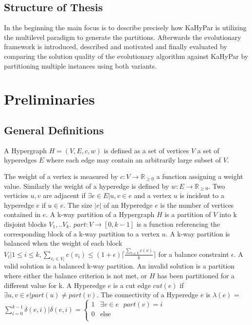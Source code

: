 \documentclass[a4paper,12pt,bibtotoc,titlepage, liststotoc,BCOR7mm,headsepline,pointlessnumbers]{scrbook}
\numberwithin{equation}{section}
\begin{document}
\section{Structure of Thesis}
In the beginning the main focus is to describe precisely how KaHyPar is utilizing the multilevel paradigm to generate the partitions. Afterwards the evolutionary framework is introduced, described and motivated and finally evaluated by comparing the solution quality of the evolutionary algorithm against KaHyPar by partitioning multiple instances using both variants. 
\chapter{Preliminaries}
\section{General Definitions}

A Hypergraph $H = (V, E, c, w)$ is defined as a set of vertices $V$ a set of hyperedges $E$ where each edge may contain an arbitrarily large subset of $V$.

The weight of a vertex is measured by $c: V \rightarrow  \mathbb R_{\ge 0}$ a function assigning a weight value. Similarly the weight of a hyperedge is defined by $w: E \rightarrow  \mathbb R_{\ge 0}$. 
Two verticies $u, v$ are adjacent if $\exists e \in E | u, v \in e$ and a vertex $u$ is incident to a hyperedge $e$ if $ u \in e$. The size $|e|$ of an Hyperedge $e$ is the number of vertices contained in $e$. A k-way partition of a Hypergraph $H$ is a partition of $V$ into k disjoint blocks $V_1, .. V_k$. $part: V \rightarrow [0, k-1]$ is a function referencing the corresponding block of a k-way partition to a vertex $u$. 
A k-way partition is balanced when the weight of each block $V_i | 1 \le i \le k, \sum_{v_i \in V_i} c(v_i) \le (1 + \epsilon) \lceil \frac{\sum_{v \in V} c(v)}{k} \rceil $  for a balance constraint $\epsilon$.
A valid solution is a balanced k-way partition. An invalid solution is a partition where either the balance criterion is not met, or $H$ has been partitioned for a different value for k.
A Hyperedge $e$ is a cut edge $cut(e)$ if $\exists u,v \in e | part(u) \neq part(v)$. The connectivity of a Hyperedge $e$ is $\lambda(e)$ = $\sum_{i=0}^{k-1} \delta(e,i) | \delta(e, i) = 
     \begin{cases}
       \text{1} &\exists v \in e\text{ }part(v)=i\\
       \text{0} &\text{else}\\
     \end{cases}$ 
\end{document}
